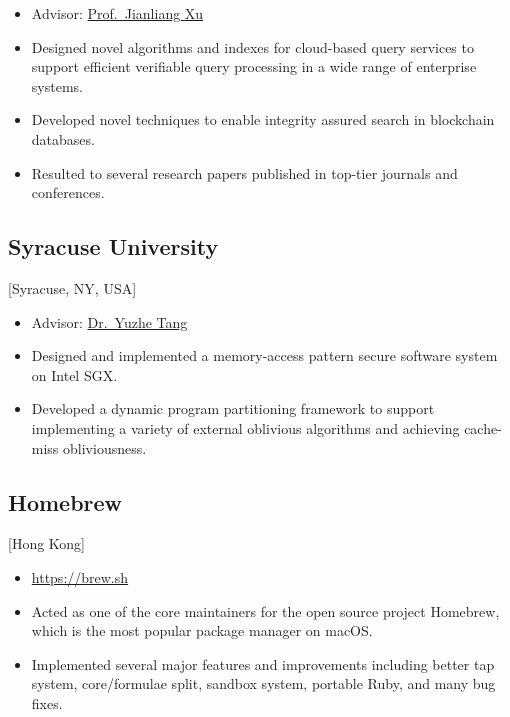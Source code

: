 \documentclass{mycv}
\begin{document}
\begin{itemize}
  \item Advisor: \href{https://www.comp.hkbu.edu.hk/~xujl}{Prof.~Jianliang Xu}
  \item Designed novel algorithms and indexes for cloud-based query services to support efficient verifiable query processing in a wide range of enterprise systems.
  \item Developed novel techniques to enable integrity assured search in blockchain databases.
  \item Resulted to several research papers published in top-tier journals and conferences.
\end{itemize}

\subsection{Syracuse University}[Syracuse, NY, USA]
\begin{positions}
\end{positions}

\begin{itemize}
  \item Advisor: \href{https://tristartom.github.io}{Dr.~Yuzhe Tang}
  \item Designed and implemented a memory-access pattern secure software system on Intel SGX\@.
  \item Developed a dynamic program partitioning framework to support implementing a variety of external oblivious algorithms and achieving cache-miss obliviousness.
\end{itemize}

\subsection{Homebrew}[Hong Kong]
\begin{positions}
\end{positions}

\begin{itemize}
  \item \url{https://brew.sh}
  \item Acted as one of the core maintainers for the open source project Homebrew, which is the most popular package manager on macOS\@.
  \item Implemented several major features and improvements including better tap system, core/formulae split, sandbox system, portable Ruby, and many bug fixes.
\end{itemize}
\end{document}
